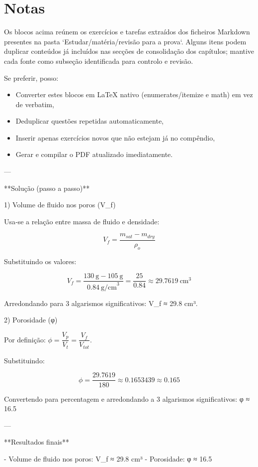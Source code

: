 \documentclass[11pt,a4paper]{article}
\begin{document}
\clearpage
\section*{Notas}
Os blocos acima reúnem os exercícios e tarefas extraídos dos ficheiros Markdown presentes na pasta `Estudar/matéria/revisão para a prova`. Alguns itens podem duplicar conteúdos já incluídos nas secções de consolidação dos capítulos; mantive cada fonte como subseção identificada para controlo e revisão.

Se preferir, posso:
\begin{itemize}
\item Converter estes blocos em LaTeX nativo (enumerates/itemize e math) em vez de verbatim,
\item Deduplicar questões repetidas automaticamente,
\item Inserir apenas exercícios novos que não estejam já no compêndio,
\item Gerar e compilar o PDF atualizado imediatamente.
\end{itemize}
 

\clearpage
---

**Solução (passo a passo)**

1) Volume de fluido nos poros (V_f)

Usa‑se a relação entre massa de fluido e densidade:

\[ V_f = \frac{m_{sat} - m_{dry}}{\rho_o} \]

Substituindo os valores:

\[ V_f = \frac{130\ \text{g} - 105\ \text{g}}{0.84\ \text{g/cm}^3} = \frac{25}{0.84} \approx 29.7619\ \text{cm}^3 \]

Arredondando para 3 algarismos significativos: V_f ≈ 29.8 cm³.

2) Porosidade (φ)

Por definição: $ \phi = \dfrac{V_p}{V_t} = \dfrac{V_f}{V_{tot}} $.

Substituindo:

\[ \phi = \dfrac{29.7619}{180} \approx 0.1653439 \approx 0.165 \]

Convertendo para percentagem e arredondando a 3 algarismos significativos: φ ≈ 16.5 %

---

**Resultados finais**

- Volume de fluido nos poros: V_f ≈ 29.8 cm³
- Porosidade: φ ≈ 16.5 %
\end{document}
